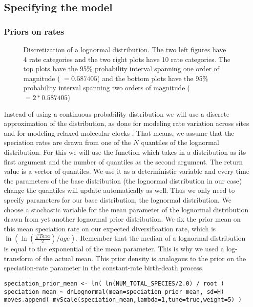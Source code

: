 \subsection{Specifying the model}

\subsubsection{Priors on rates}
\begin{figure}[htbp!]
\centering
{}
\caption{\small Discretization of a lognormal distribution. The two left figures have 4 rate categories and the two right plots have 10 rate categories. The top plots have the 95\% probability interval spanning one order of magnitude ( $=0.587405$) and the bottom plots have the 95\% probability interval spanning two orders of magnitude ( $=2*0.587405$)}
\label{fig:BSBD_discretization}
\end{figure}
Instead of using a continuous probability distribution we will use a discrete approximation of the distribution, as done for modeling rate variation across sites \citep{Yang1994a} and for modeling relaxed molecular clocks \citep{Drummond2006}.
That means, we assume that the speciation rates are drawn from one of the $N$ quantiles of the lognormal distribution.
For this we will use the function  which takes in a distribution as its first argument and the number of quantiles as the second argument.
The return value is a vector of quantiles.
We use it as a deterministic variable and every time the parameters of the base distribution (\IE the lognormal distribution in our case) change the quantiles will update automatically as well.
Thus we only need to specify parameters for our base distribution, the lognormal distribution.
We choose a stochastic variable for the mean parameter of the lognormal distribution drawn from yet another lognormal prior distribution.
We fix the prior mean on this mean speciation rate on our expected diversification rate, which is $\ln( \ln(\frac{\#Taxa}{2})/age )$.
Remember that the median of a lognormal distribution is equal to the exponential of the mean parameter.
This is why we used a log-transform of the actual mean.
This prior density is analogous to the prior on the speciation-rate parameter in the constant-rate birth-death process.
{\tt \begin{snugshade*}
\begin{lstlisting}
speciation_prior_mean <- ln( ln(NUM_TOTAL_SPECIES/2.0) / root )
speciation_mean ~ dnLognormal(mean=speciation_prior_mean, sd=H)
moves.append( mvScale(speciation_mean,lambda=1,tune=true,weight=5) )
\end{lstlisting}
\end{snugshade*}}
